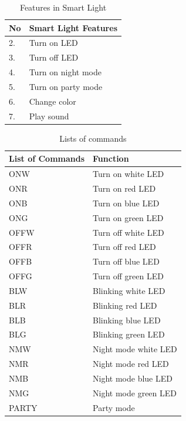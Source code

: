 \documentclass[conference]{IEEEtran}
\begin{document}
\begin{table}[]
\begin{center}
\caption{Features in Smart Light}
\begin{tabular}{|l|l|}
\hline
No & Smart   Light Features \\ \hline
2. & Turn on LED            \\ \hline
3. & Turn off LED           \\ \hline
4. & Turn on night mode     \\ \hline
5. & Turn on party mode     \\ \hline
6. & Change color           \\ \hline
7. & Play sound             \\ \hline
\end{tabular}
\end{center}
\end{table}






\begin{table}[]
\begin{center}
\caption{Lists of commands}
\begin{tabular}{|l|l|}
\hline
List of Commands & Function             \\ \hline
ONW              & Turn on white LED    \\ \hline
ONR              & Turn on red LED      \\ \hline
ONB              & Turn on blue LED     \\ \hline
ONG              & Turn on green LED    \\ \hline
OFFW             & Turn off white LED   \\ \hline
OFFR             & Turn off red LED     \\ \hline
OFFB             & Turn off blue LED    \\ \hline
OFFG             & Turn off green LED   \\ \hline
BLW              & Blinking white LED   \\ \hline
BLR              & Blinking red LED     \\ \hline
BLB              & Blinking blue LED    \\ \hline
BLG              & Blinking green LED   \\ \hline
NMW              & Night mode white LED \\ \hline
NMR              & Night mode red LED   \\ \hline
NMB              & Night mode blue LED  \\ \hline
NMG              & Night mode green LED \\ \hline
PARTY            & Party mode           \\ \hline
\end{tabular}
\end{center}
\end{table}
\end{document}
